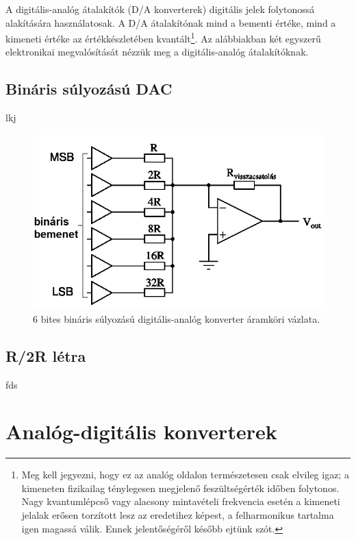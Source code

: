 \documentclass[12pt]{article}
\theoremstyle{plain}
\begin{document}
A digitális-analóg átalakítók (D/A konverterek) digitális jelek folytonossá alakítására használatosak. A D/A átalakítónak mind a bementi értéke, mind a kimeneti értéke az értékkészletében kvantált\footnote{Meg kell jegyezni, hogy ez az analóg oldalon természetesen csak elvileg igaz; a kimeneten fizikailag ténylegesen megjelenő feszültségérték időben folytonos. Nagy kvantumlépcső vagy alacsony mintavételi frekvencia esetén a kimeneti jelalak erősen torzított lesz az eredetihez képest, a felharmonikus tartalma igen magassá válik. Ennek jelentőségéről később ejtünk szót.}. Az alábbiakban két egyszerű elektronikai megvalósítását nézzük meg a digitális-analóg átalakítóknak.


\subsection{Bináris súlyozású DAC}

lkj


\begin{figure}
	\centering
	\includegraphics[width=0.7\linewidth]{media/DAC_binaris}
	\caption{6 bites bináris súlyozású digitális-analóg konverter áramköri vázlata.}
	\label{fig:dacbinaris}
\end{figure}


\subsection{R/2R létra}

fds





\section{Analóg-digitális konverterek}
\end{document}
